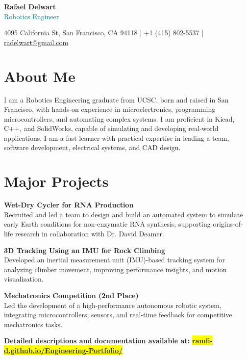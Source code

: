 \documentclass[a4paper,9pt]{article}
\begin{document}
\begin{center}
    {\Large \textbf{Rafael Delwart}} \\
    {\small \textcolor{teal}{Robotics Engineer}} \\
    \vspace{0.3em}
    {\footnotesize
        4095 California St, San Francisco, CA 94118 \quad | \quad
        +1 (415) 802-5537 \quad | \quad
        \href{mailto:radelwart@gmail.com}{radelwart@gmail.com} \quad 
        
    }
    \vspace{0.8em}
\end{center}

\section*{About Me}
 I am a Robotics Engineering graduate from UCSC, born and raised in San Francisco, with hands-on experience in microelectronics, programming microcontrollers, and automating complex systems. I am proficient in Kicad, C++, and SolidWorks, capable of simulating and developing real-world applications. I am a fast learner with practical expertise in leading a team, software development, electrical systems, and CAD design.\normalsize

\section*{Major Projects}

\small 

\textbf{Wet-Dry Cycler for RNA Production} \\
Recruited and led a team to design and build an automated system to simulate early Earth conditions for non-enzymatic RNA synthesis, supporting origins-of-life research in collaboration with Dr. David Deamer.

\textbf{3D Tracking Using an IMU for Rock Climbing} \\
Developed an inertial measurement unit (IMU)-based tracking system for analyzing climber movement, improving performance insights, and motion visualization.

\textbf{Mechatronics Competition (2nd Place)} \\
Led the development of a high-performance autonomous robotic system, integrating microcontrollers, sensors, and real-time feedback for competitive mechatronics tasks.

\textbf{Detailed descriptions and documentation available at: }\colorbox{yellow}{\href{https://ramfi-d.github.io/Engineering-Portfolio/}{\textbf{ramfi-d.github.io/Engineering-Portfolio/}}}
\end{document}
